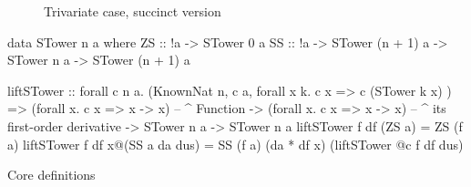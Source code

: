\documentclass[./rims-smooth-paper.tex]{subfiles}
\begin{document}
\begin{figure}[htbp]
  \centering
  \caption{Trivariate case, succinct version\label{fig:tree}}
\end{figure}

\begin{listing}[tbp]
\begin{code}
data STower n a where
  ZS :: !a -> STower 0 a
  SS :: !a -> STower (n + 1) a -> STower n a -> STower (n + 1) a

liftSTower
  :: forall c n a. (KnownNat n, c a, forall x k. c x => c (STower k x) )
  => (forall x. c x => x -> x)
      -- ^ Function
  -> (forall x. c x => x -> x)
      -- ^ its first-order derivative
  -> STower n a
  -> STower n a
liftSTower f df (ZS a) = ZS (f a)
liftSTower f df x@(SS a da dus)
  = SS (f a) (da * df x) 
       (liftSTower @c f df dus)
\end{code}
\caption{Core definitions\label{lst:data-def}}
\end{listing}
\end{document}
